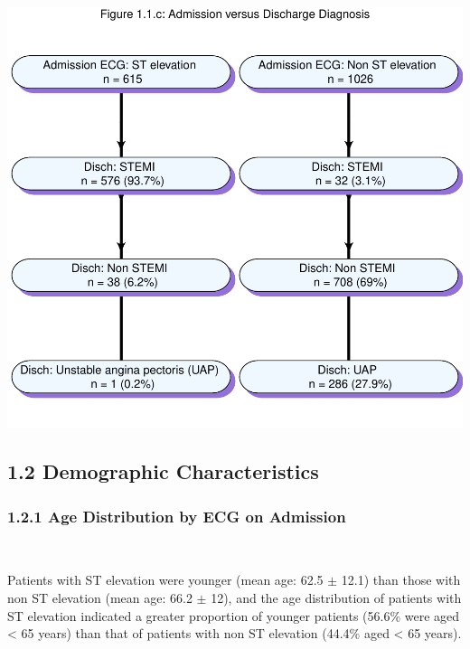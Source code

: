 \documentclass[
]{article}
\begin{document}
\includegraphics{‏‏ACSIS_2024_v1_with_trend_pdf_files/figure-latex/unnamed-chunk-7-1.pdf}

\pagebreak

\subsection{1.2 Demographic
Characteristics}\label{demographic-characteristics}

\subsubsection{1.2.1 Age Distribution by ECG on
Admission}\label{age-distribution-by-ecg-on-admission}

~

Patients with ST elevation were younger (mean age: 62.5 \(\pm\) 12.1)
than those with non ST elevation (mean age: 66.2 \(\pm\) 12), and the
age distribution of patients with ST elevation indicated a greater
proportion of younger patients (56.6\% were aged \textless{} 65 years)
than that of patients with non ST elevation (44.4\% aged \textless{} 65
years).

~
\end{document}
